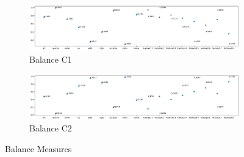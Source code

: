 \begin{figure}[h!]
    \centering
    \begin{subfigure}{0.496\textwidth}
        \includegraphics[width=0.99\linewidth]{figures/balance-C1.png}
        \caption{Balance C1}
        \label{fig:balance-c1}
    \end{subfigure}
    \begin{subfigure}{0.496\textwidth}
        \includegraphics[width=0.99\linewidth]{figures/balance-C2.png}
        \caption{Balance C2}
        \label{fig:balance-c2}
    \end{subfigure}
    \caption{Balance Measures}
    \label{fig:balance}
\end{figure}

